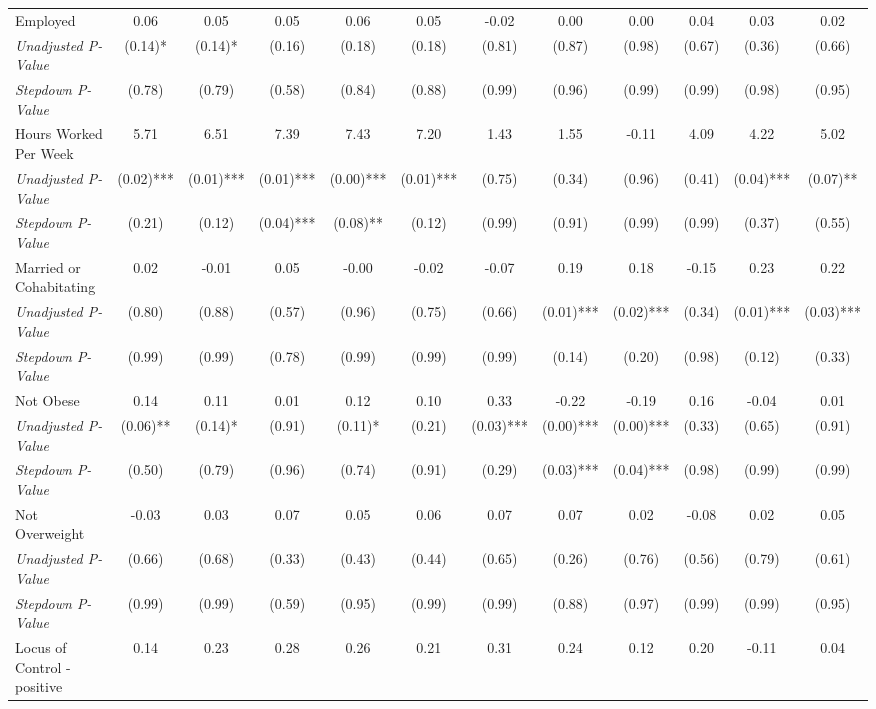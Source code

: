 \begin{tabular}{l c c c c c c c c c c c}
Employed & 0.06 & 0.05 & 0.05 & 0.06 & 0.05 & -0.02 & 0.00 & 0.00 & 0.04 & 0.03 & 0.02 \\
\quad \textit{Unadjusted P-Value} & (0.14)* & (0.14)* & (0.16) & (0.18) & (0.18) & (0.81) & (0.87) & (0.98) & (0.67) & (0.36) & (0.66) \\
\quad \textit{Stepdown P-Value} & (0.78) & (0.79) & (0.58) & (0.84) & (0.88) & (0.99) & (0.96) & (0.99) & (0.99) & (0.98) & (0.95) \\
Hours Worked Per Week & 5.71 & 6.51 & 7.39 & 7.43 & 7.20 & 1.43 & 1.55 & -0.11 & 4.09 & 4.22 & 5.02 \\
\quad \textit{Unadjusted P-Value} & (0.02)*** & (0.01)*** & (0.01)*** & (0.00)*** & (0.01)*** & (0.75) & (0.34) & (0.96) & (0.41) & (0.04)*** & (0.07)** \\
\quad \textit{Stepdown P-Value} & (0.21) & (0.12) & (0.04)*** & (0.08)** & (0.12) & (0.99) & (0.91) & (0.99) & (0.99) & (0.37) & (0.55) \\
Married or Cohabitating & 0.02 & -0.01 & 0.05 & -0.00 & -0.02 & -0.07 & 0.19 & 0.18 & -0.15 & 0.23 & 0.22 \\
\quad \textit{Unadjusted P-Value} & (0.80) & (0.88) & (0.57) & (0.96) & (0.75) & (0.66) & (0.01)*** & (0.02)*** & (0.34) & (0.01)*** & (0.03)*** \\
\quad \textit{Stepdown P-Value} & (0.99) & (0.99) & (0.78) & (0.99) & (0.99) & (0.99) & (0.14) & (0.20) & (0.98) & (0.12) & (0.33) \\
Not Obese & 0.14 & 0.11 & 0.01 & 0.12 & 0.10 & 0.33 & -0.22 & -0.19 & 0.16 & -0.04 & 0.01 \\
\quad \textit{Unadjusted P-Value} & (0.06)** & (0.14)* & (0.91) & (0.11)* & (0.21) & (0.03)*** & (0.00)*** & (0.00)*** & (0.33) & (0.65) & (0.91) \\
\quad \textit{Stepdown P-Value} & (0.50) & (0.79) & (0.96) & (0.74) & (0.91) & (0.29) & (0.03)*** & (0.04)*** & (0.98) & (0.99) & (0.99) \\
Not Overweight & -0.03 & 0.03 & 0.07 & 0.05 & 0.06 & 0.07 & 0.07 & 0.02 & -0.08 & 0.02 & 0.05 \\
\quad \textit{Unadjusted P-Value} & (0.66) & (0.68) & (0.33) & (0.43) & (0.44) & (0.65) & (0.26) & (0.76) & (0.56) & (0.79) & (0.61) \\
\quad \textit{Stepdown P-Value} & (0.99) & (0.99) & (0.59) & (0.95) & (0.99) & (0.99) & (0.88) & (0.97) & (0.99) & (0.99) & (0.95) \\
Locus of Control - positive & 0.14 & 0.23 & 0.28 & 0.26 & 0.21 & 0.31 & 0.24 & 0.12 & 0.20 & -0.11 & 0.04 \\

\end{tabular}
